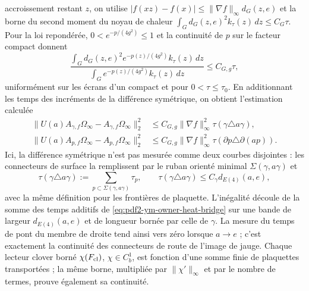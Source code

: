 accroissement restant $z$, on utilise
$|f(xz)-f(x)|\le\|\nabla f\|_\infty d_G(z,e)$ et la borne du second moment du
noyau de chaleur
\(
 \int_Gd_G(z,e)^2k_\tau(z)\,dz\le C_G\tau
\).
Pour la loi repondérée, $0<e^{-p/(4g^2)}\le1$ et la continuité de $p$ sur le
facteur compact donnent
\begin{equation}\label{eq:pdf2-ym-owner-gibbs-heat-moment}
 \frac{\int_Gd_G(z,e)^2e^{-p(z)/(4g^2)}k_\tau(z)\,dz}
      {\int_Ge^{-p(z)/(4g^2)}k_\tau(z)\,dz}
 \le C_{G,g}\tau,
\end{equation}
uniformément sur les écrans d’un compact et pour $0<\tau\le\tau_0$.
En additionnant les temps des incréments de la différence symétrique, on obtient
l’estimation calculée
\begin{equation}\label{eq:pdf2-ym-owner-holonomy-e4-estimate}
 \begin{aligned}
 \|U(a)A_{\gamma,f}\Omega_\infty-A_{\gamma,f}\Omega_\infty\|_2^2
 &\le C_{G,g}\|\nabla f\|_\infty^2
     \tau(\gamma\triangle a\gamma),\\
 \|U(a)A_{p,f}\Omega_\infty-A_{p,f}\Omega_\infty\|_2^2
 &\le C_{G,g}\|\nabla f\|_\infty^2
     \tau(\partial p\triangle\partial(ap)).
 \end{aligned}
\end{equation}
Ici, la différence symétrique n'est pas mesurée comme deux courbes disjointes : les connecteurs de surface la remplissent par le ruban orienté minimal $\Sigma(\gamma,a\gamma)$ et
\begin{equation}\label{eq:pdf2-ym-owner-bridge-time-ribbon}
 \tau(\gamma\triangle a\gamma)
 :=\sum_{p\subset\Sigma(\gamma,a\gamma)}\tau_p,
 \qquad
 \tau(\gamma\triangle a\gamma)
 \le C_\gamma d_{E(4)}(a,e),
\end{equation}
avec la même définition pour les frontières de plaquette. L’inégalité découle de la
somme des temps additifs de \eqref{eq:pdf2-ym-owner-heat-bridge} sur une bande
de largeur $d_{E(4)}(a,e)$ et de longueur bornée par celle de $\gamma$.
La mesure du temps de pont du membre de droite tend ainsi vers zéro lorsque $a\to e$ ;
c’est exactement la continuité des connecteurs de route de l’image de jauge.
Chaque lecteur clover borné $\chi(F_{\rm cl})$, $\chi\in C_b^1$, est fonction d’une
somme finie de plaquettes transportées ; la même borne, multipliée par
$\|\chi'\|_\infty$ et par le nombre de termes, prouve également sa continuité.

